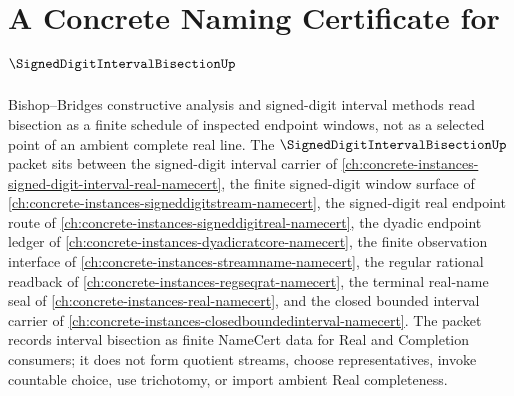 \chapter{A Concrete Naming Certificate for $\SignedDigitIntervalBisectionUp$}
\label{ch:concrete-instances-signed-digit-interval-bisection-namecert}

Bishop--Bridges constructive analysis and signed-digit interval methods read bisection as a finite schedule of inspected endpoint windows, not as a selected point of an ambient complete real line. The $\SignedDigitIntervalBisectionUp$ packet sits between the signed-digit interval carrier of \autoref{ch:concrete-instances-signed-digit-interval-real-namecert}, the finite signed-digit window surface of \autoref{ch:concrete-instances-signeddigitstream-namecert}, the signed-digit real endpoint route of \autoref{ch:concrete-instances-signeddigitreal-namecert}, the dyadic endpoint ledger of \autoref{ch:concrete-instances-dyadicratcore-namecert}, the finite observation interface of \autoref{ch:concrete-instances-streamname-namecert}, the regular rational readback of \autoref{ch:concrete-instances-regseqrat-namecert}, the terminal real-name seal of \autoref{ch:concrete-instances-real-namecert}, and the closed bounded interval carrier of \autoref{ch:concrete-instances-closedboundedinterval-namecert}. The packet records interval bisection as finite NameCert data for Real and Completion consumers; it does not form quotient streams, choose representatives, invoke countable choice, use trichotomy, or import ambient Real completeness.

